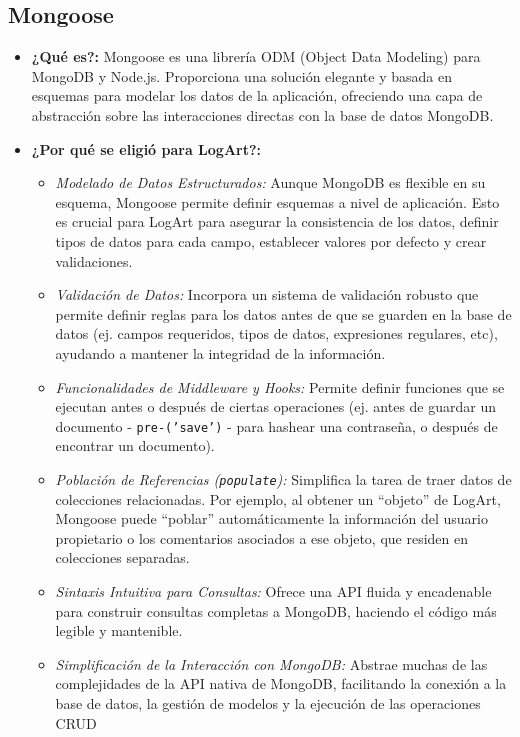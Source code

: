 \subsection{Mongoose}
\label{sec:mongoose}

\begin{itemize}
    \item \textbf{¿Qué es?:} Mongoose es una librería ODM (Object Data Modeling) para MongoDB y Node.js. Proporciona una solución elegante y basada en esquemas para modelar los datos de la aplicación, ofreciendo una capa de abstracción sobre las interacciones directas con la base de datos MongoDB. \cite{freecodecampMongooseIntro}

    \item \textbf{¿Por qué se eligió para LogArt?:}
        \begin{itemize}
            \item \textit{Modelado de Datos Estructurados:} Aunque MongoDB es flexible en su esquema, Mongoose permite definir esquemas a nivel de aplicación. Esto es crucial para LogArt para asegurar la consistencia de los datos, definir tipos de datos para cada campo, establecer valores por defecto y crear validaciones.
            \item \textit{Validación de Datos:} Incorpora un sistema de validación robusto que permite definir reglas para los datos antes de que se guarden en la base de datos (ej. campos requeridos, tipos de datos, expresiones regulares, etc), ayudando a mantener la integridad de la información.
            \item \textit{Funcionalidades de Middleware y Hooks:} Permite definir funciones que se ejecutan antes o después de ciertas operaciones (ej. antes de guardar un documento - \texttt{pre-('save')} - para hashear una contraseña, o después de encontrar un documento).
            \item \textit{Población de Referencias (\texttt{populate}):} Simplifica la tarea de traer datos de colecciones relacionadas. Por ejemplo, al obtener un ``objeto'' de LogArt, Mongoose puede ``poblar'' automáticamente la información del usuario propietario o los comentarios asociados a ese objeto, que residen en colecciones separadas.
            \item \textit{Sintaxis Intuitiva para Consultas:} Ofrece una API fluida y encadenable para construir consultas completas a MongoDB, haciendo el código más legible y mantenible.
            \item \textit{Simplificación de la Interacción con MongoDB:} Abstrae muchas de las complejidades de la API nativa de MongoDB, facilitando la conexión a la base de datos, la gestión de modelos y la ejecución de las operaciones CRUD
        \end{itemize}
        

\end{itemize}

